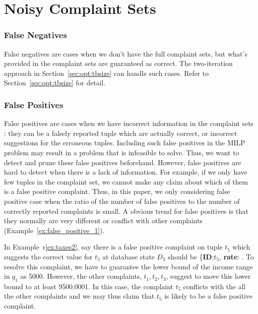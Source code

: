 \section{Noisy Complaint Sets}
\label{sec:noise}

\subsubsection{False Negatives}
False negatives are cases when we don't have the full complaint sets, but
what's provided in the complaint sets are guaranteed as correct. The 
two-iteration approach in Section~\ref{sec:opt:tbsize} can handle 
such cases. Refer to Section~\ref{sec:opt:tbsize} for detail.
\subsubsection{False Positives}
False positives are cases when we have incorrect information in the complaint sets 
: they can be a falsely reported tuple which are actually 
correct, or incorrect suggestions for the erroneous tuples. 
Including such false positives in the MILP problem may result in a problem
that is infeasible to solve. Thus, we want to detect and prune these false positives 
beforehand. However, false positives are hard to 
detect when there is a lack of information. 
For example, if we only have few tuples in the complaint
set, we cannot make any claim about which of them is a false positive 
complaint. Thus, in this paper, we only considering false positive
case when the ratio of the number of false positives to the number
of correctly reported complaints is small.
A obvious trend for false positives is that they normally are very 
different or conflict
with other complaints (Example~\ref{ex:false_positive_1}).
\begin{example} \label{ex:false_positive_1}
In Example~r\ref{ex:taxes2}, say there is 
a false positive complaint on tuple $t_5$ which suggests the correct value
for $t_5$ at database state $D_3$ should be 
\{\textbf{ID}:$t_5$, \textbf{rate}: \color{red}{30}
\color{red}{\$1500}\color{black}{\}}. To resolve this complaint, we have
to guarantee the lower bound of the income range in $q_1$ as 5000. 
However, the other complaints, $t_1, t_2, t_3$, suggest to
move this lower bound to at least 9500.0001. In this case, the complaint
$t_5$ conflicts with the all the other complaints and we may thus
claim that $t_5$ is likely to be a false positive complaint. 
\end{example}
